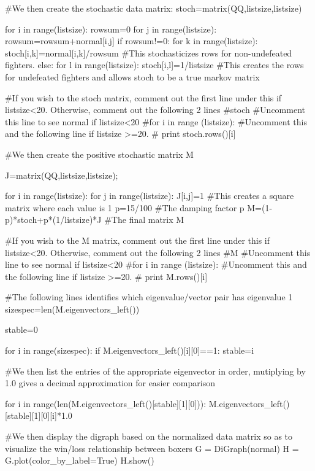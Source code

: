 \documentclass{ximera}
\begin{document}
\begin{sageCell}
            
#We then create the stochastic data matrix:
stoch=matrix(QQ,listsize,listsize)
    
for i in range(listsize):
    rowsum=0
    for j in range(listsize):
        rowsum=rowsum+normal[i,j]
    if rowsum!=0:
        for k in range(listsize):
            stoch[i,k]=normal[i,k]/rowsum #This stochasticizes rows for non-undefeated fighters.
    else:
        for l in range(listsize):
            stoch[i,l]=1/listsize #This creates the rows for undefeated fighters and allows stoch to be a true markov matrix

#If you wish to the stoch matrix, comment out the first line under this if listsize<20.  Otherwise, comment out the following 2 lines
#stoch #Uncomment this line to see normal if listsize<20
#for i in range (listsize): #Uncomment this and the following line if listsize >=20.
#    print stoch.rows()[i]

#We then create the positive stochastic matrix M

J=matrix(QQ,listsize,listsize);

for i in range(listsize):
    for j in range(listsize):
        J[i,j]=1 #This creates a square matrix where each value is 1
p=15/100 #The damping factor p
M=(1-p)*stoch+p*(1/listsize)*J #The final matrix M

#If you wish to the M matrix, comment out the first line under this if listsize<20.  Otherwise, comment out the following 2 lines
#M #Uncomment this line to see normal if listsize<20
#for i in range (listsize): #Uncomment this and the following line if listsize >=20.
#    print M.rows()[i]


#The following lines identifies which eigenvalue/vector pair has eigenvalue 1
sizespec=len(M.eigenvectors_left())

stable=0

for i in range(sizespec):
    if M.eigenvectors_left()[i][0]==1:
        stable=i

        
#We then list the entries of the appropriate eigenvector in order, mutiplying by 1.0 gives a decimal approximation for easier comparison
        
for i in range(len(M.eigenvectors_left()[stable][1][0])):
    M.eigenvectors_left()[stable][1][0][i]*1.0
    

#We then display the digraph based on the normalized data matrix so as to visualize the win/loss relationship between boxers    
G = DiGraph(normal)
H = G.plot(color_by_label=True)
H.show()\end{sageCell}
\end{document}
